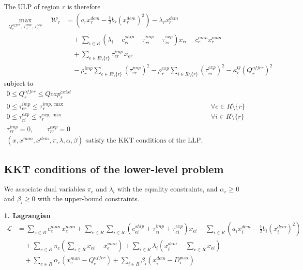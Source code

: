 \documentclass[11pt,a4paper]{article}
\begin{document}
The ULP of region \(r\) is therefore
\begin{align}
\max_{Q_r^{offer},\,\tau_{\cdot r}^{imp},\,\tau_{r\cdot}^{exp}} \quad
\mathcal{W}_r
&=
\left(
a_r x_r^{dem}-\frac12 b_r (x_r^{dem})^2
\right)-\lambda_r x_r^{dem}
\nonumber\\
&\quad
+
\sum_{i\in R}
\left(
\lambda_i-c_{ri}^{ship}-\tau_{ri}^{imp}-\tau_{ri}^{exp}
\right)x_{ri}
-c_r^{man}x_r^{man}
\nonumber\\
&\quad
+
\sum_{e\in R\setminus\{r\}}\tau_{er}^{imp}\,x_{er}
\nonumber\\
&\quad
-\rho_r^{imp}\sum_{e\in R\setminus\{r\}}\left(\tau_{er}^{imp}\right)^2
-\rho_r^{exp}\sum_{i\in R\setminus\{r\}}\left(\tau_{ri}^{exp}\right)^2
-\kappa_r^Q\left(Q_r^{offer}\right)^2
\label{eq:ulp_obj}
\end{align}
subject to
\begin{align}
0 \le Q_r^{offer} \le Qcap_r^{exist}
\label{eq:ulp_Q}
\\
0 \le \tau_{er}^{imp} \le \tau_r^{imp,\max}
&& \forall e \in R\setminus\{r\}
\label{eq:ulp_tauimp}
\\
0 \le \tau_{ri}^{exp} \le \tau_r^{exp,\max}
&& \forall i \in R\setminus\{r\}
\label{eq:ulp_tauexp}
\\
\tau_{rr}^{imp}=0,\qquad \tau_{rr}^{exp}=0
\label{eq:ulp_diag}
\\
(x,x^{man},x^{dem},\pi,\lambda,\alpha,\beta)\text{ satisfy the KKT conditions of the LLP.}
\label{eq:ulp_llp_link}
\end{align}

\subsection{KKT conditions of the lower-level problem}

We associate dual variables \(\pi_e\) and \(\lambda_i\) with the equality constraints, and
\(\alpha_e \ge 0\) and \(\beta_i \ge 0\) with the upper-bound constraints.

\textbf{1. Lagrangian}
\begin{align}
\mathcal{L}
&=
\sum_{e\in R} c_e^{man}\,x_e^{man}
+
\sum_{e\in R}\sum_{i\in R}
\left(
c_{ei}^{ship}+\tau_{ei}^{imp}+\tau_{ei}^{exp}
\right)x_{ei}
-
\sum_{i\in R}
\left(
a_i x_i^{dem}-\frac12 b_i (x_i^{dem})^2
\right)
\nonumber\\
&\quad
+
\sum_{e\in R}\pi_e\left(\sum_{i\in R}x_{ei}-x_e^{man}\right)
+
\sum_{i\in R}\lambda_i\left(x_i^{dem}-\sum_{e\in R}x_{ei}\right)
\nonumber\\
&\quad
+
\sum_{e\in R}\alpha_e\left(x_e^{man}-Q_e^{offer}\right)
+
\sum_{i\in R}\beta_i\left(x_i^{dem}-D_i^{\max}\right)
\label{eq:kkt_lagrangian}
\end{align}
\end{document}
